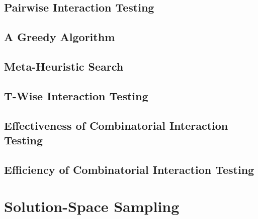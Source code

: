 \subsection{Pairwise Interaction Testing}

\subsection{A Greedy Algorithm}

\subsection{Meta-Heuristic Search}

\subsection{T-Wise Interaction Testing}

\subsection{Effectiveness of Combinatorial Interaction Testing}

\subsection{Efficiency of Combinatorial Interaction Testing}

%

\lessonslearned{
	\item \ldots
}{
	\item \ldots
}{
	\ldots
}

\sectionend

\section{Solution-Space Sampling}

